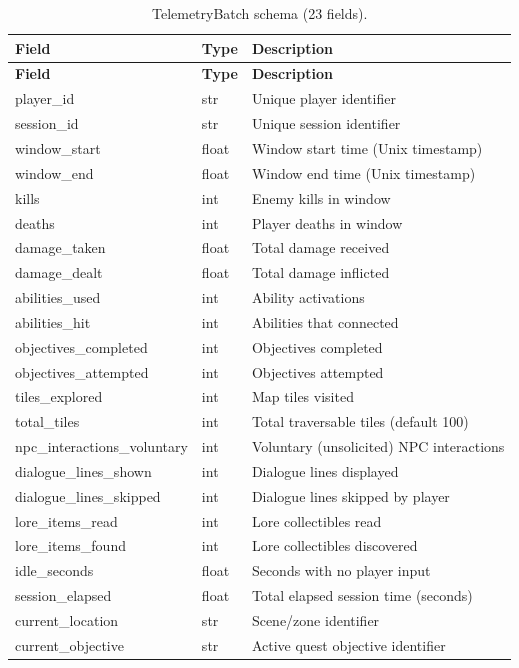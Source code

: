 \begin{longtable}{@{}p{4.5cm} p{1.2cm} p{7.3cm}@{}}
\caption{TelemetryBatch schema (23 fields).} \label{tab:telemetry} \\
\toprule
\textbf{Field} & \textbf{Type} & \textbf{Description} \\
\midrule
\endfirsthead
\toprule
\textbf{Field} & \textbf{Type} & \textbf{Description} \\
\midrule
\endhead
player\_id & str & Unique player identifier \\
session\_id & str & Unique session identifier \\
window\_start & float & Window start time (Unix timestamp) \\
window\_end & float & Window end time (Unix timestamp) \\
kills & int & Enemy kills in window \\
deaths & int & Player deaths in window \\
damage\_taken & float & Total damage received \\
damage\_dealt & float & Total damage inflicted \\
abilities\_used & int & Ability activations \\
abilities\_hit & int & Abilities that connected \\
objectives\_completed & int & Objectives completed \\
objectives\_attempted & int & Objectives attempted \\
tiles\_explored & int & Map tiles visited \\
total\_tiles & int & Total traversable tiles (default 100) \\
npc\_interactions\_voluntary & int & Voluntary (unsolicited) NPC interactions \\
dialogue\_lines\_shown & int & Dialogue lines displayed \\
dialogue\_lines\_skipped & int & Dialogue lines skipped by player \\
lore\_items\_read & int & Lore collectibles read \\
lore\_items\_found & int & Lore collectibles discovered \\
idle\_seconds & float & Seconds with no player input \\
session\_elapsed & float & Total elapsed session time (seconds) \\
current\_location & str & Scene/zone identifier \\
current\_objective & str & Active quest objective identifier \\
\bottomrule
\end{longtable}

